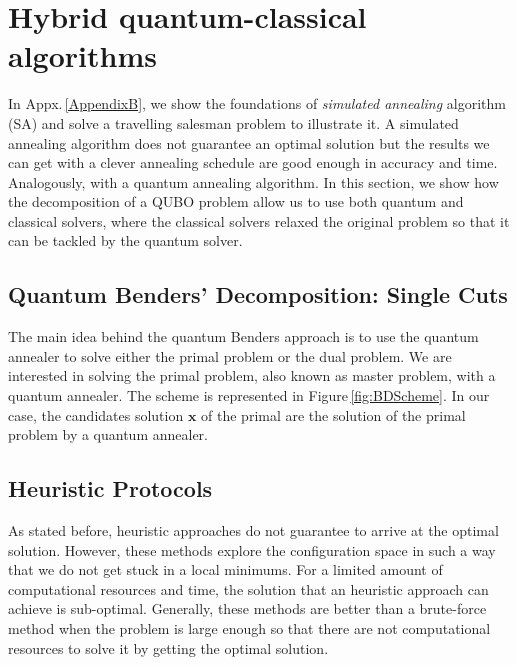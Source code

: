 \section{Hybrid quantum-classical algorithms}
In Appx.\,\ref{AppendixB}, we show the foundations of \textit{simulated annealing} algorithm (SA) and solve a travelling salesman problem to illustrate it. A simulated annealing algorithm does not guarantee an optimal solution but the results we can get with a clever annealing schedule are good enough in accuracy and time. Analogously, with a quantum annealing algorithm. In this section, we show how the decomposition of a QUBO problem allow us to use both quantum and classical solvers, where the classical solvers relaxed the original problem so that it can be tackled by the quantum solver.
\subsection{Quantum Benders' Decomposition: Single Cuts}
The main idea behind the quantum Benders approach is to use the quantum annealer to solve either the primal problem or the dual problem. We are interested in solving the primal problem, also known as master problem, with a quantum annealer. The scheme is represented in Figure\,\ref{fig:BDScheme}. In our case, the candidates solution $\textbf{x}$ of the primal are the solution of the primal problem by a quantum annealer.
\subsection{Heuristic Protocols}
As stated before, heuristic approaches do not guarantee to arrive at the optimal solution. However, these methods explore the configuration space in such a way that we do not get stuck in a local minimums. For a limited amount of computational resources and time, the solution that an heuristic approach can achieve is sub-optimal. Generally, these methods are better than a brute-force method when the problem is large enough so that there are not computational resources to solve it by getting the optimal solution.
